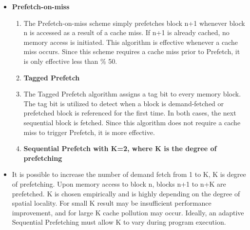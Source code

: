 \documentclass[12pt]{article}
\begin{document}
\vspace{\baselineskip}
\begin{itemize}
	\item {\fontsize{16pt}{19.2pt}\selectfont \textbf{\textcolor[HTML]{222222}{Prefetch-on-miss}}\par}\par

\begin{enumerate}
	\item {\fontsize{15pt}{18.0pt}\selectfont \textcolor[HTML]{222222}{The Prefetch-on-miss scheme simply prefetches block n+1 whenever block n is accessed as a result of a cache miss. If n+1 is already cached, no memory access is initiated. This algorithm is effective whenever a cache miss occurs. Since this scheme requires a cache miss prior to Prefetch, it is only effective less than $\%$ 50.}\par}\par


\vspace{\baselineskip}
	\item {\fontsize{16pt}{19.2pt}\selectfont \textbf{\textcolor[HTML]{222222}{Tagged Prefetch}}\par}\par

	\item {\fontsize{15pt}{18.0pt}\selectfont \textcolor[HTML]{222222}{The Tagged Prefetch algorithm assigns a tag bit to every memory block. The tag bit is utilized to detect when a block is demand-fetched or prefetched block is referenced for the first time. In both cases, the next sequential block is fetched. Since this algorithm does not require a cache miss to trigger Prefetch, it is more effective.}\par}\par


\vspace{\baselineskip}
	\item {\fontsize{15pt}{18.0pt}\selectfont \textbf{\textcolor[HTML]{222222}{Sequential Prefetch with K=2, where K is the degree of prefetching}}\par}
\end{enumerate}\par

	\item {\fontsize{15pt}{18.0pt}\selectfont \textcolor[HTML]{222222}{It is possible to increase the number of demand fetch from 1 to K, K is degree of prefetching. Upon memory access to block n, blocks n+1 to n+K are prefetched. K is chosen empirically and is highly depending on the degree of spatial locality. For small K result may be insufficient performance improvement, and for large K cache pollution may occur. Ideally, an adaptive Sequential Prefetching must allow K to vary during program execution.}\par}
\end{itemize}\par
\end{document}
